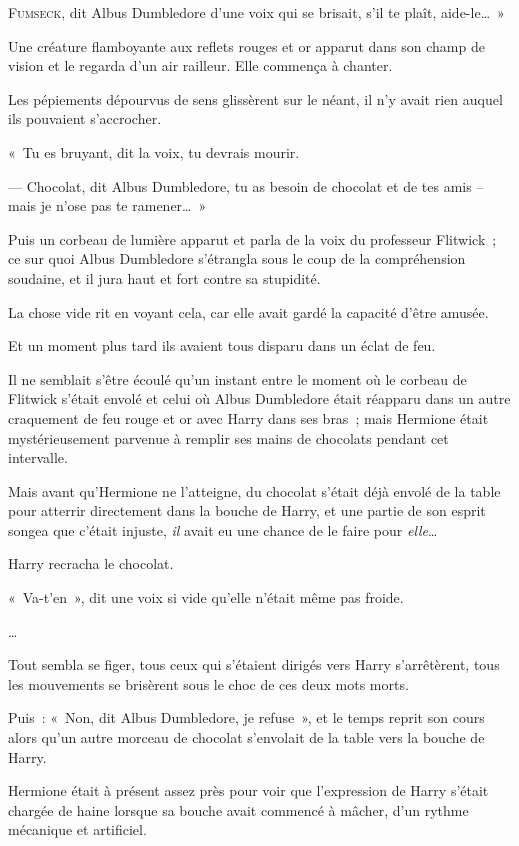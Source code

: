 
\lettrine[ante=«~]{F}{umseck}, dit Albus Dumbledore d'une voix qui se brisait, s'il te plaît, aide-le…~»

Une créature flamboyante aux reflets rouges et or apparut dans son champ de vision et le regarda d'un air railleur. Elle commença à chanter.

Les pépiements dépourvus de sens glissèrent sur le néant, il n'y avait rien auquel ils pouvaient s'accrocher.

«~Tu es bruyant, dit la voix, tu devrais mourir.

--- Chocolat, dit Albus Dumbledore, tu as besoin de chocolat et de tes amis -- mais je n'ose pas te ramener…~»

Puis un corbeau de lumière apparut et parla de la voix du professeur Flitwick~; ce sur quoi Albus Dumbledore s'étrangla sous le coup de la compréhension soudaine, et il jura haut et fort contre sa stupidité.

La chose vide rit en voyant cela, car elle avait gardé la capacité d'être amusée.

\later

Et un moment plus tard ils avaient tous disparu dans un éclat de feu.

Il ne semblait s'être écoulé qu'un instant entre le moment où le corbeau de Flitwick s'était envolé et celui où Albus Dumbledore était réapparu dans un autre craquement de feu rouge et or avec Harry dans ses bras~; mais Hermione était mystérieusement parvenue à remplir ses mains de chocolats pendant cet intervalle.

Mais avant qu'Hermione ne l'atteigne, du chocolat s'était déjà envolé de la table pour atterrir directement dans la bouche de Harry, et une partie de son esprit songea que c'était injuste, \emph{il} avait eu une chance de le faire pour \emph{elle}…

Harry recracha le chocolat.

«~Va-t'en~», dit une voix si vide qu'elle n'était même pas froide.

…

Tout sembla se figer, tous ceux qui s'étaient dirigés vers Harry s'arrêtèrent, tous les mouvements se brisèrent sous le choc de ces deux mots morts.

Puis~: «~Non, dit Albus Dumbledore, je refuse~», et le temps reprit son cours alors qu'un autre morceau de chocolat s'envolait de la table vers la bouche de Harry.

Hermione était à présent assez près pour voir que l'expression de Harry s'était chargée de haine lorsque sa bouche avait commencé à mâcher, d'un rythme mécanique et artificiel.

